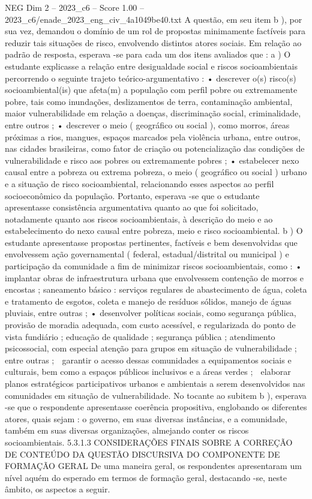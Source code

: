 \begin{textsample}{NEG Dim 2 – 2023\_c6 – Score 1.00 – 2023\_c6/enade\_2023\_eng\_civ\_4a1049be40.txt}
A questão, em seu item b ), por sua vez, demandou o domínio de um rol de propostas minimamente factíveis para reduzir tais situações de risco, envolvendo distintos atores sociais.
Em relação ao padrão de resposta, esperava -se para cada um dos itens avaliados que : a ) O estudante explicasse a relação entre desigualdade social e riscos socioambientais percorrendo o seguinte trajeto teórico-argumentativo : • descrever o(s) risco(s) socioambiental(is) que afeta(m) a população com perfil pobre ou extremamente pobre, tais como inundações, deslizamentos de terra, contaminação ambiental, maior vulnerabilidade em relação a doenças, discriminação social, criminalidade, entre outros ; • descrever o meio ( geográfico ou social ), como morros, áreas próximas a rios, mangues, espaços marcados pela violência urbana, entre outros, nas cidades brasileiras, como fator de criação ou potencialização das condições de vulnerabilidade e risco aos pobres ou extremamente pobres ; • estabelecer nexo causal entre a pobreza ou extrema pobreza, o meio ( geográfico ou social ) urbano e a situação de risco socioambiental, relacionando esses aspectos ao perfil socioeconômico da população.
Portanto, esperava -se que o estudante apresentasse consistência argumentativa quanto ao que foi solicitado, notadamente quanto aos riscos socioambientais, à descrição do meio e ao estabelecimento do nexo causal entre pobreza, meio e risco socioambiental. b ) O estudante apresentasse propostas pertinentes, factíveis e bem desenvolvidas que envolvessem ação governamental ( federal, estadual/distrital ou municipal ) e participação da comunidade a fim de minimizar riscos socioambientais, como : • implantar obras de infraestrutura urbana que envolvessem contenção de morros e encostas ; saneamento básico : serviços regulares de abastecimento de água, coleta e tratamento de esgotos, coleta e manejo de resíduos sólidos, manejo de águas pluviais, entre outras ; • desenvolver políticas sociais, como segurança pública, provisão de moradia adequada, com custo acessível, e regularizada do ponto de vista fundiário ; educação de qualidade ; segurança pública ; atendimento psicossocial, com especial atenção para grupos em situação de vulnerabilidade ; entre outras ;  garantir o acesso dessas comunidades a equipamentos sociais e culturais, bem como a espaços públicos inclusivos e a áreas verdes ;  elaborar planos estratégicos participativos urbanos e ambientais a serem desenvolvidos nas comunidades em situação de vulnerabilidade.
No tocante ao subitem b ), esperava -se que o respondente apresentasse coerência propositiva, englobando os diferentes atores, quais sejam : o governo, em suas diversas instâncias, e a comunidade, também em suas diversas organizações, almejando conter os riscos socioambientais. 5.3.1.3 CONSIDERAÇÕES FINAIS SOBRE A CORREÇÃO DE CONTEÚDO DA QUESTÃO DISCURSIVA DO COMPONENTE DE FORMAÇÃO GERAL De uma maneira geral, os respondentes apresentaram um nível aquém do esperado em termos de formação geral, destacando -se, neste âmbito, os aspectos a seguir.

\end{textsample}
